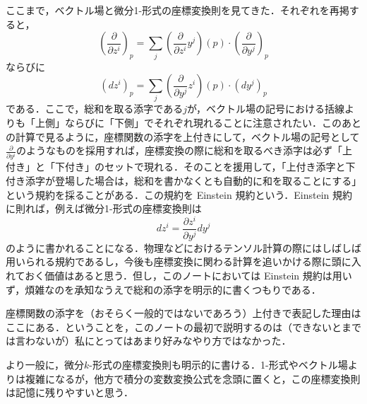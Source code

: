 \begin{dig}
ここまで，ベクトル場と微分1-形式の座標変換則を見てきた．それぞれを再掲すると，
\begin{equation}
\left( \frac{\partial}{\partial z^i} \right)_p = \sum_{j} \left( \frac{\partial }{\partial z^i} y^j \right) (p) \cdot \left( \frac{\partial}{\partial y^j} \right)_p
\end{equation}
ならびに
\begin{equation}
\left(dz^i\right)_p = \sum_{j} \left( \frac{\partial }{\partial y^j} z^i \right) (p) \cdot \left( dy^j \right)_p
\end{equation}である．ここで，総和を取る添字である$j$が，ベクトル場の記号における括線よりも「上側」ならびに「下側」でそれぞれ現れることに注意されたい．このあとの計算で見るように，座標関数の添字を上付きにして，ベクトル場の記号として$\frac{\partial}{\partial y^i}$のようなものを採用すれば，座標変換の際に総和を取るべき添字は必ず「上付き」と「下付き」のセットで現れる．そのことを援用して，「上付き添字と下付き添字が登場した場合は，総和を書かなくとも自動的に和を取ることにする」という規約を採ることがある．この規約を Einstein 規約という．Einstein 規約に則れば，例えば微分1-形式の座標変換則は
\begin{equation}
dz^i = \frac{\partial z^i}{\partial y^j} dy^j
\end{equation}のように書かれることになる．物理などにおけるテンソル計算の際にはしばしば用いられる規約であるし，今後も座標変換に関わる計算を追いかける際に頭に入れておく価値はあると思う．但し，このノートにおいては Einstein 規約は用いず，煩雑なのを承知なうえで総和の添字を明示的に書くつもりである．

座標関数の添字を（おそらく一般的ではないであろう）上付きで表記した理由はここにある．ということを，このノートの最初で説明するのは（できないとまでは言わないが）私にとってはあまり好みなやり方ではなかった．
\end{dig}

より一般に，微分$k$-形式の座標変換則も明示的に書ける．1-形式やベクトル場よりは複雑になるが，他方で積分の変数変換公式を念頭に置くと，この座標変換則は記憶に残りやすいと思う．

